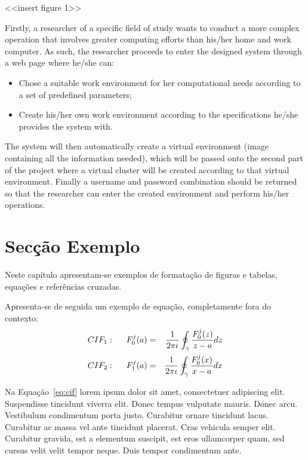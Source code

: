 <<insert figure 1>>

Firstly, a researcher of a specific field of study wants to conduct a more complex operation that involves greater computing efforts than his/her home and work computer. As such, the researcher proceeds to enter the designed system through a web page where he/she can:

\begin{itemize}
	\item Chose a suitable work environment for her computational needs according to a set of predefined parameters;
	\item Create his/her own work environment according to the specifications he/she provides the system with.
\end{itemize}

The system will then automatically create a virtual environment (image containing all the information needed), which will be passed onto the second part of the project where a virtual cluster will be created according to that virtual environment.
Finally a username and password combination should be returned so that the researcher can enter the created environment and perform his/her operations.



\section{Secção Exemplo}

Neste capítulo apresentam-se exemplos de formatação de figuras e
tabelas, equações e referências cruzadas.

Apresenta-se de seguida um exemplo de equação, completamente fora do contexto:
\begin{eqnarray}
CIF_1: \hspace*{5mm}F_0^j(a) &=& \frac{1}{2\pi \iota} \oint_{\gamma} \frac{F_0^j(z)}{z - a} dz\\
CIF_2: \hspace*{5mm}F_1^j(a) &=& \frac{1}{2\pi \iota} \oint_{\gamma} \frac{F_0^j(x)}{x - a} dx \label{eq:cif}
\end{eqnarray}

Na Equação~\ref{eq:cif} lorem ipsum dolor sit amet, consectetuer
adipiscing elit. Suspendisse tincidunt viverra elit. Donec tempus
vulputate mauris. Donec arcu. Vestibulum condimentum porta
justo. Curabitur ornare tincidunt lacus. Curabitur ac massa vel ante
tincidunt placerat. Cras vehicula semper elit. Curabitur gravida, est
a elementum suscipit, est eros ullamcorper quam, sed cursus velit
velit tempor neque. Duis tempor condimentum ante.

